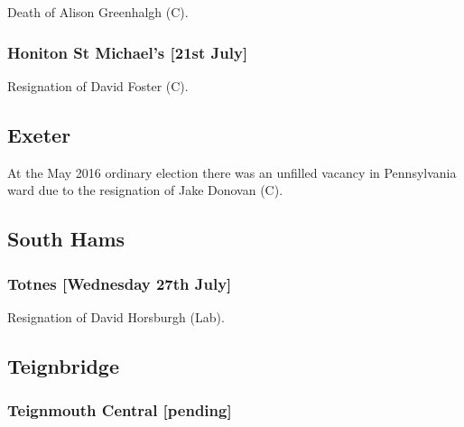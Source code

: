 \documentclass[a4paper,openany]{book}
\begin{document}
\begin{resultsiii}

Death of Alison Greenhalgh (C).

\subsubsection*{Honiton St Michael's \hspace*{\fill}\nolinebreak[1]%
\enspace\hspace*{\fill}
[21st July]}


Resignation of David Foster (C).

\subsection*{Exeter}

At the May 2016 ordinary election there was an unfilled vacancy in Pennsylvania ward due to the resignation of Jake Donovan (C).

\subsection*{South Hams}

\subsubsection*{Totnes \hspace*{\fill}\nolinebreak[1]%
\enspace\hspace*{\fill}
[Wednesday 27th July]}


Resignation of David Horsburgh (Lab).

\subsection*{Teignbridge}

\subsubsection*{Teignmouth Central \hspace*{\fill}\nolinebreak[1]%
\enspace\hspace*{\fill}
[pending]}


\end{resultsiii}
\end{document}
